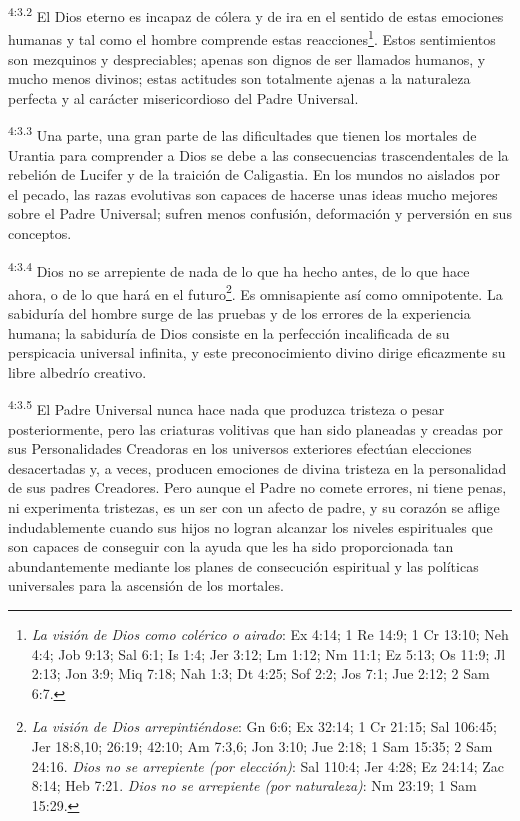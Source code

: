 \par
\textsuperscript{4:3.2} El Dios eterno es incapaz de cólera y de ira en el sentido de estas emociones humanas y tal como el hombre comprende estas reacciones\footnote{\textit{La visión de Dios como colérico o airado}: Ex 4:14; 1 Re 14:9; 1 Cr 13:10; Neh 4:4; Job 9:13; Sal 6:1; Is 1:4; Jer 3:12; Lm 1:12; Nm 11:1; Ez 5:13; Os 11:9; Jl 2:13; Jon 3:9; Miq 7:18; Nah 1:3; Dt 4:25; Sof 2:2; Jos 7:1; Jue 2:12; 2 Sam 6:7.}. Estos sentimientos son mezquinos y despreciables; apenas son dignos de ser llamados humanos, y mucho menos divinos; estas actitudes son totalmente ajenas a la naturaleza perfecta y al carácter misericordioso del Padre Universal.

\par
\textsuperscript{4:3.3} Una parte, una gran parte de las dificultades que tienen los mortales de Urantia para comprender a Dios se debe a las consecuencias trascendentales de la rebelión de Lucifer y de la traición de Caligastia. En los mundos no aislados por el pecado, las razas evolutivas son capaces de hacerse unas ideas mucho mejores sobre el Padre Universal; sufren menos confusión, deformación y perversión en sus conceptos.

\par
\textsuperscript{4:3.4} Dios no se arrepiente de nada de lo que ha hecho antes, de lo que hace ahora, o de lo que hará en el futuro\footnote{\textit{La visión de Dios arrepintiéndose}: Gn 6:6; Ex 32:14; 1 Cr 21:15; Sal 106:45; Jer 18:8,10; 26:19; 42:10; Am 7:3,6; Jon 3:10; Jue 2:18; 1 Sam 15:35; 2 Sam 24:16. \textit{Dios no se arrepiente (por elección)}: Sal 110:4; Jer 4:28; Ez 24:14; Zac 8:14; Heb 7:21. \textit{Dios no se arrepiente (por naturaleza)}: Nm 23:19; 1 Sam 15:29.}. Es omnisapiente así como omnipotente. La sabiduría del hombre surge de las pruebas y de los errores de la experiencia humana; la sabiduría de Dios consiste en la perfección incalificada de su perspicacia universal infinita, y este preconocimiento divino dirige eficazmente su libre albedrío creativo.

\par
\textsuperscript{4:3.5} El Padre Universal nunca hace nada que produzca tristeza o pesar posteriormente, pero las criaturas volitivas que han sido planeadas y creadas por sus Personalidades Creadoras en los universos exteriores efectúan elecciones desacertadas y, a veces, producen emociones de divina tristeza en la personalidad de sus padres Creadores. Pero aunque el Padre no comete errores, ni tiene penas, ni experimenta tristezas, es un ser con un afecto de padre, y su corazón se aflige indudablemente cuando sus hijos no logran alcanzar los niveles espirituales que son capaces de conseguir con la ayuda que les ha sido proporcionada tan abundantemente mediante los planes de consecución espiritual y las políticas universales para la ascensión de los mortales.

